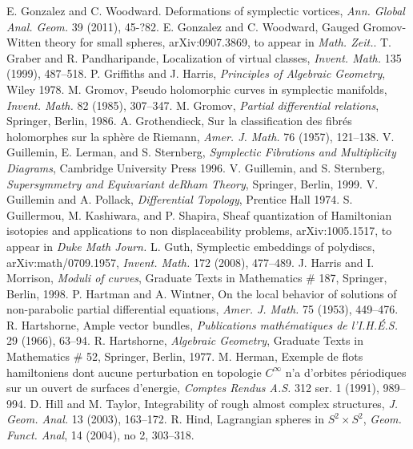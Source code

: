  E. Gonzalez and C. Woodward. Deformations of symplectic vortices, \emph{Ann. Global Anal. Geom.} 39 (2011), 45-?82.
 E. Gonzalez and C. Woodward, Gauged Gromov-Witten theory for small spheres, arXiv:0907.3869, to appear in \emph{Math. Zeit.}.
 T. Graber and R. Pandharipande, Localization of virtual classes, \emph{Invent. Math.} 135 (1999), 487--518.
 P. Griffiths and J. Harris, \emph{Principles of Algebraic Geometry}, Wiley 1978.
 M. Gromov, Pseudo holomorphic curves in symplectic manifolds, \emph{Invent. Math.} 82 (1985), 307--347.
 M. Gromov, \emph{Partial differential relations}, Springer, Berlin, 1986.
 A. Grothendieck, Sur la classification des fibr\'es holomorphes sur la sph\`ere de Riemann, \emph{Amer. J. Math.} 76 (1957), 121--138.
 V. Guillemin, E. Lerman, and S. Sternberg, \emph{Symplectic Fibrations and Multiplicity Diagrams}, Cambridge University Press 1996.
 V. Guillemin, and S. Sternberg, \emph{Supersymmetry and Equivariant deRham Theory}, Springer, Berlin, 1999.
 V. Guillemin and A. Pollack, \emph{Differential Topology}, Prentice Hall 1974.
 S. Guillermou, M. Kashiwara, and P. Shapira, Sheaf quantization of Hamiltonian isotopies and applications to non displaceability problems, arXiv:1005.1517, to appear in \emph{Duke Math Journ.}
 L. Guth, Symplectic embeddings of polydiscs, arXiv:math/0709.1957, \emph{Invent. Math.} 172 (2008), 477--489.
 J. Harris and I. Morrison, \emph{Moduli of curves}, Graduate Texts in Mathematics \# 187, Springer, Berlin, 1998.
 P. Hartman and A. Wintner, On the local behavior of solutions of non-parabolic partial differential equations, \emph{Amer. J. Math.} 75 (1953), 449--476.
 R. Hartshorne, Ample vector bundles, \emph{Publications math\'ematiques de l'I.H.\'E.S.} 29 (1966), 63--94.
 R. Hartshorne, \emph{Algebraic Geometry}, Graduate Texts in Mathematics \# 52, Springer, Berlin, 1977.
 M. Herman, Exemple de flots hamiltoniens dont aucune perturbation en topologie $C^\infty$ n'a d'orbites p\'eriodiques sur un ouvert de surfaces d'energie, \emph{Comptes Rendus A.S.} 312 ser. 1 (1991), 989--994.
 D. Hill and M. Taylor, Integrability of rough almost complex structures, \emph{J. Geom. Anal.} 13 (2003), 163--172.
 R. Hind, Lagrangian spheres in $S^2\times S^2$, \emph{Geom. Funct. Anal}, 14 (2004), no 2, 303--318.
